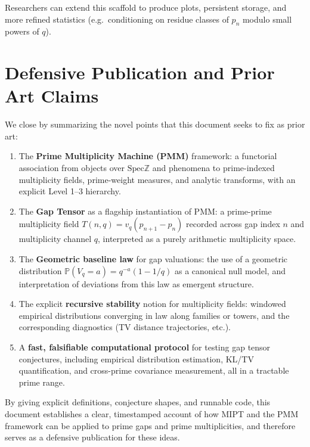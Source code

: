 \documentclass[11pt]{article}
\theoremstyle{definition}
\theoremstyle{plain}
\theoremstyle{remark}
\newcommand{\Spec}{\mathrm{Spec}}
\newcommand{\ZZ}{\mathbb{Z}}
\newcommand{\Prob}{\mathbb{P}}
\newcommand{\1}{\mathbb{1}}
\begin{document}
Researchers can extend this scaffold to produce plots, persistent storage, and more refined statistics (e.g.\ conditioning on residue classes of \(p_n\) modulo small powers of \(q\)).

\section{Defensive Publication and Prior Art Claims}

We close by summarizing the novel points that this document seeks to fix as prior art:

\begin{enumerate}[leftmargin=*]
  \item The \textbf{Prime Multiplicity Machine (PMM)} framework: a functorial association from objects over \(\Spec \ZZ\) and phenomena to prime-indexed multiplicity fields, prime-weight measures, and analytic transforms, with an explicit Level 1--3 hierarchy.
  \item The \textbf{Gap Tensor} as a flagship instantiation of PMM: a prime-prime multiplicity field \(T(n,q)=v_q(p_{n+1}-p_n)\) recorded across gap index \(n\) and multiplicity channel \(q\), interpreted as a purely arithmetic multiplicity space.
  \item The \textbf{Geometric baseline law} for gap valuations: the use of a geometric distribution \(\Prob(V_q=a)=q^{-a}(1-1/q)\) as a canonical null model, and interpretation of deviations from this law as emergent structure.
  \item The explicit \textbf{recursive stability} notion for multiplicity fields: windowed empirical distributions converging in law along families or towers, and the corresponding diagnostics (TV distance trajectories, etc.).
  \item A \textbf{fast, falsifiable computational protocol} for testing gap tensor conjectures, including empirical distribution estimation, KL/TV quantification, and cross-prime covariance measurement, all in a tractable prime range.
\end{enumerate}

By giving explicit definitions, conjecture shapes, and runnable code, this document establishes a clear, timestamped account of how MIPT and the PMM framework can be applied to prime gaps and prime multiplicities, and therefore serves as a defensive publication for these ideas.
\end{document}
